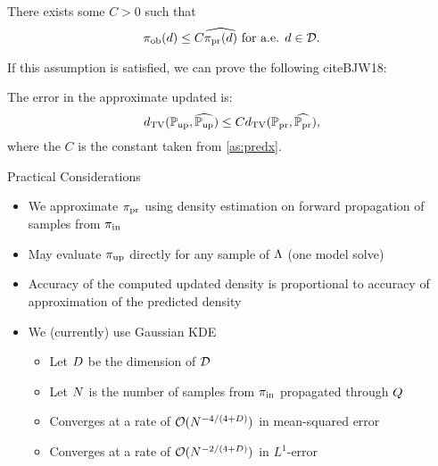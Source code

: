 \begin{frame}[t]
\begin{assumption}\label{as:predx}
There exists some $C>0$ such that
\[
\operatorname*{\pi_{ob}} (d) \leq C \widehat{\operatorname*{\pi_{pr}}(d)} \text{ for a.e. } d\in \mathcal{D}.
\]
\end{assumption}

If this assumption is satisfied, we can prove the following cite{BJW18}:

\begin{theorem}
The error in the approximate updated is:
\begin{equation}\label{eq:pred_bound}
d_{\text{TV}} (\operatorname*{\mathbb{P}_{up}}, \widehat{\operatorname*{\mathbb{P}_{up}}}) \leq C d_{\text{TV}} (\operatorname*{\mathbb{P}_{pr}}, \widehat{\operatorname*{\mathbb{P}_{pr}}}),
\end{equation}
where the $C$ is the constant taken from \eqref{as:predx}.
\end{theorem}

\end{frame}


\begin{frame}[t]{Practical Considerations}

\begin{itemize}
	\item We approximate $\operatorname*{\pi_{pr}}$ using density estimation on forward propagation of samples from $\operatorname*{\pi_{in}}$
	\item May evaluate $\operatorname*{\pi_{up}}$ directly for any sample of ${\Lambda}$ (one model solve)
	\item Accuracy of the computed updated density is proportional to accuracy of approximation of the predicted density
	\item We (currently) use Gaussian KDE
	\begin{itemize}
			\item Let $D$ be the dimension of $\mathcal{D}$
			\item Let $N$ is the number of samples from $\operatorname*{\pi_{in}}$ propagated through $Q$
			\item Converges at a rate of $\mathcal{O}(N^{-4/(4+D)})$ in mean-squared error
			\item Converges at a rate of $\mathcal{O}(N^{-2/(4+D)})$ in $L^1$-error
	\end{itemize}
\end{itemize}
\end{frame}
